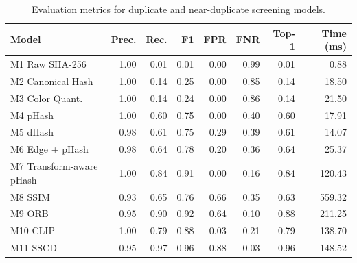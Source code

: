 \begin{table}[htbp]
\caption{Evaluation metrics for duplicate and near-duplicate screening models.}
\label{tab:metrics}
\centering
\begin{tabular}{lrrrrrrr}
\toprule
Model & Prec. & Rec. & F1 & FPR & FNR & Top-1 & Time (ms) \\
\midrule
M1 Raw SHA-256 & 1.00 & 0.01 & 0.01 & 0.00 & 0.99 & 0.01 & 0.88 \\
M2 Canonical Hash & 1.00 & 0.14 & 0.25 & 0.00 & 0.85 & 0.14 & 18.50 \\
M3 Color Quant. & 1.00 & 0.14 & 0.24 & 0.00 & 0.86 & 0.14 & 21.50 \\
M4 pHash & 1.00 & 0.60 & 0.75 & 0.00 & 0.40 & 0.60 & 17.91 \\
M5 dHash & 0.98 & 0.61 & 0.75 & 0.29 & 0.39 & 0.61 & 14.07 \\
M6 Edge + pHash & 0.98 & 0.64 & 0.78 & 0.20 & 0.36 & 0.64 & 25.37 \\
M7 Transform-aware pHash & 1.00 & 0.84 & 0.91 & 0.00 & 0.16 & 0.84 & 120.43 \\
M8 SSIM & 0.93 & 0.65 & 0.76 & 0.66 & 0.35 & 0.63 & 559.32 \\
M9 ORB & 0.95 & 0.90 & 0.92 & 0.64 & 0.10 & 0.88 & 211.25 \\
M10 CLIP & 1.00 & 0.79 & 0.88 & 0.03 & 0.21 & 0.79 & 138.70 \\
M11 SSCD & 0.95 & 0.97 & 0.96 & 0.88 & 0.03 & 0.96 & 148.52 \\
\bottomrule
\end{tabular}
\end{table}
